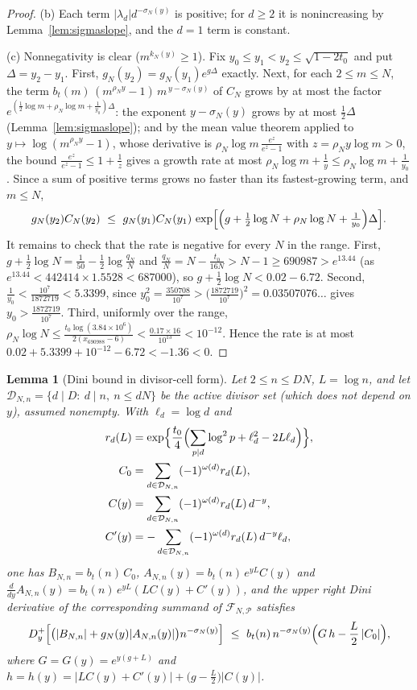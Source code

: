 \documentclass[11pt]{article}
\newtheorem{lemma}[theorem]{Lemma}
\theoremstyle{definition}
\newcommand{\calP}{\mathcal{P}}
\begin{document}
\begin{proof}
(b) Each term $|\lambda_d|d^{-\sigma_N(y)}$ is positive; for
$d\ge2$ it is nonincreasing by Lemma~\ref{lem:sigmaslope}, and the
$d=1$ term is constant.

(c) Nonnegativity is clear ($m^{k_N(y)}\ge1$). Fix
$y_0\le y_1<y_2\le\sqrt{1-2t_0}$ and put $\Delta=y_2-y_1$. First,
$g_N(y_2)=g_N(y_1)e^{g\Delta}$ exactly. Next, for each
$2\le m\le N$, the term
$b_t(m)\,(m^{\rho_Ny}-1)\,m^{\,y-\sigma_N(y)}$ of $C_N$ grows by at
most the factor $e^{(\frac12\log m+\rho_N\log m+\frac1{y_0})\Delta}$:
the exponent $y-\sigma_N(y)$ grows by at most $\frac12\Delta$
(Lemma~\ref{lem:sigmaslope}); and by the mean value theorem applied
to $y\mapsto\log(m^{\rho_Ny}-1)$, whose derivative is
$\rho_N\log m\,\frac{e^z}{e^z-1}$ with $z=\rho_Ny\log m>0$, the
bound $\frac{e^z}{e^z-1}\le1+\frac1z$ gives a growth rate at most
$\rho_N\log m+\frac1{y}\le\rho_N\log m+\frac1{y_0}$. Since a sum of
positive terms grows no faster than its fastest-growing term, and
$m\le N$,
\[
g_N(y_2)C_N(y_2)\ \le\
g_N(y_1)C_N(y_1)\,
\exp\Bigl[\Bigl(g+\tfrac12\log N+\rho_N\log N
+\tfrac1{y_0}\Bigr)\Delta\Bigr].
\]
It remains to check that the rate is negative for every $N$ in the
range. First, $g+\frac12\log N=\frac1{50}-\frac12\log\frac{q_N}N$
and $\frac{q_N}N=N-\frac{t_0}{16N}>N-1\ge690987>e^{13.44}$ (as
$e^{13.44}<442414\times1.5528<687000$), so
$g+\frac12\log N<0.02-6.72$. Second,
$\frac1{y_0}<\frac{10^7}{1872719}<5.3399$, since
$y_0^2=\frac{350708}{10^7}>\bigl(\frac{1872719}{10^7}\bigr)^2
=0.03507076\ldots$ gives $y_0>\frac{1872719}{10^7}$. Third,
uniformly over the range,
$\rho_N\log N\le\frac{t_0\log(3.84\times10^6)}{2(x_{690988}-6)}
<\frac{0.17\times16}{10^{13}}<10^{-12}$. Hence the rate is at most
$0.02+5.3399+10^{-12}-6.72<-1.36<0$.
\end{proof}

\begin{lemma}[Dini bound in divisor-cell form]\label{lem:dini}
Let $2\le n\le DN$, $L=\log n$, and let
$\mathcal D_{N,n}=\{d\mid D:\ d\mid n,\ n\le dN\}$ be the active
divisor set (which does not depend on $y$), assumed nonempty. With
$\ell_d=\log d$ and
\begin{align*}
r_d(L) &= \exp\Bigl\{\frac{t_0}4\Bigl(\sum_{p\mid d}\log^2p
+\ell_d^2-2L\ell_d\Bigr)\Bigr\},
\\
C_0 &= \sum_{d\in\mathcal D_{N,n}}(-1)^{\omega(d)}r_d(L),
\\
C(y) &= \sum_{d\in\mathcal D_{N,n}}(-1)^{\omega(d)}r_d(L)\,d^{-y},
\\
C'(y) &= -\sum_{d\in\mathcal D_{N,n}}(-1)^{\omega(d)}r_d(L)\,
d^{-y}\ell_d,
\end{align*}
one has $B_{N,n}=b_t(n)\,C_0$,
$A_{N,n}(y)=b_t(n)\,e^{yL}C(y)$ and
$\frac{d}{dy}A_{N,n}(y)=b_t(n)\,e^{yL}(LC(y)+C'(y))$, and the upper
right Dini derivative of the corresponding summand of
$\mathcal F_{N,\calP}$ satisfies
\[
D^+_y\Bigl[\bigl(|B_{N,n}|+g_N(y)|A_{N,n}(y)|\bigr)
n^{-\sigma_N(y)}\Bigr]
\ \le\
b_t(n)\,n^{-\sigma_N(y)}
\Bigl(G\,h-\frac L2\,|C_0|\Bigr),
\]
where $G=G(y)=e^{y(g+L)}$ and
$h=h(y)=|LC(y)+C'(y)|+\bigl(g-\tfrac L2\bigr)|C(y)|$.
\end{lemma}
\end{document}
